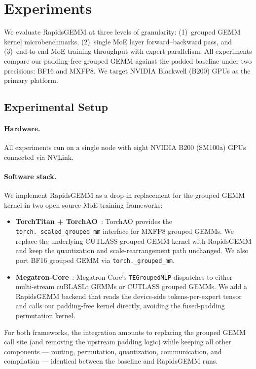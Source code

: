 \documentclass[11pt,a4paper]{article}
\theoremstyle{definition}
\begin{document}
\section{Experiments}
\label{sec:experiments}

We evaluate RapidsGEMM at three levels of granularity: (1)~grouped GEMM
kernel microbenchmarks, (2)~single MoE layer forward--backward pass, and
(3)~end-to-end MoE training throughput with expert parallelism.
All experiments compare our padding-free grouped GEMM against the
padded baseline under two precisions: BF16 and MXFP8.
We target NVIDIA Blackwell (B200) GPUs as the primary platform.

\subsection{Experimental Setup}
\label{sec:exp-setup}

\paragraph{Hardware.}
All experiments run on a single node with eight NVIDIA B200 (SM100a) GPUs
connected via NVLink.

\paragraph{Software stack.}
We implement RapidsGEMM as a drop-in replacement for the grouped GEMM
kernel in two open-source MoE training frameworks:
\begin{itemize}
  \item \textbf{TorchTitan + TorchAO}~\cite{torchtitan2025,torchao2025}:
    TorchAO provides the \texttt{torch.\_scaled\_grouped\_mm} interface
    for MXFP8 grouped GEMMs.
    We replace the underlying CUTLASS grouped GEMM kernel with RapidsGEMM
    and keep the quantization and scale-rearrangement path unchanged.
    We also port BF16 grouped GEMM via
    \texttt{torch.\_grouped\_mm}.
  \item \textbf{Megatron-Core}~\cite{nvidia2026megatronmoe}:
    Megatron-Core's \texttt{TEGroupedMLP} dispatches to either
    multi-stream cuBLASLt GEMMs or CUTLASS grouped GEMMs.
    We add a RapidsGEMM backend that reads the device-side
    tokens-per-expert tensor and calls our padding-free kernel
    directly, avoiding the fused-padding permutation kernel.
\end{itemize}
For both frameworks, the integration amounts to replacing the
grouped GEMM call site (and removing the upstream padding logic)
while keeping all other components --- routing, permutation,
quantization, communication, and compilation --- identical between
the baseline and RapidsGEMM runs.
\end{document}
